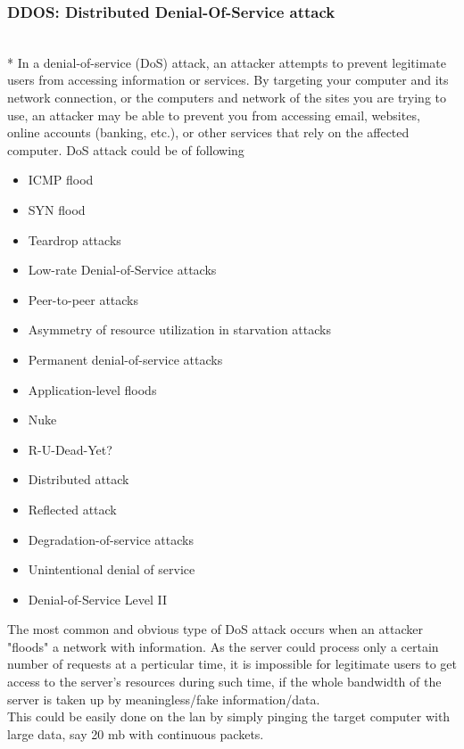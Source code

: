 \documentclass[12pt]{article}
\begin{document}
\newpage

\subsubsection{DDOS: Distributed Denial-Of-Service attack }\\*
In a denial-of-service (DoS) attack, an attacker attempts to prevent legitimate users from accessing information or services. By targeting your computer and its network connection, or the computers and network of the sites you are trying to use, an attacker may be able to prevent you from accessing email, websites, online accounts (banking, etc.), or other services that rely on the affected computer.\cite{Peng03protectionfrom}
DoS attack could be of following\\
\begin{itemize}

\item ICMP flood
\item SYN flood
\item Teardrop attacks
\item Low-rate Denial-of-Service attacks
\item Peer-to-peer attacks
\item Asymmetry of resource utilization in starvation attacks
\item Permanent denial-of-service attacks
\item Application-level floods
\item Nuke
\item R-U-Dead-Yet?
\item Distributed attack
\item Reflected attack
\item Degradation-of-service attacks
\item Unintentional denial of service
\item Denial-of-Service Level II
\end{itemize}


\indent The most common and obvious type of DoS attack occurs when an attacker "floods" a network with information. As the server could process only a certain number of requests at a perticular time, it is impossible for legitimate users to get access to the server's resources during such time, if the whole bandwidth of the server is taken up by meaningless/fake information/data.\\

\indent This could be easily done on the lan by simply pinging the target computer with large data, say 20 mb with continuous packets.\\
\end{document}
